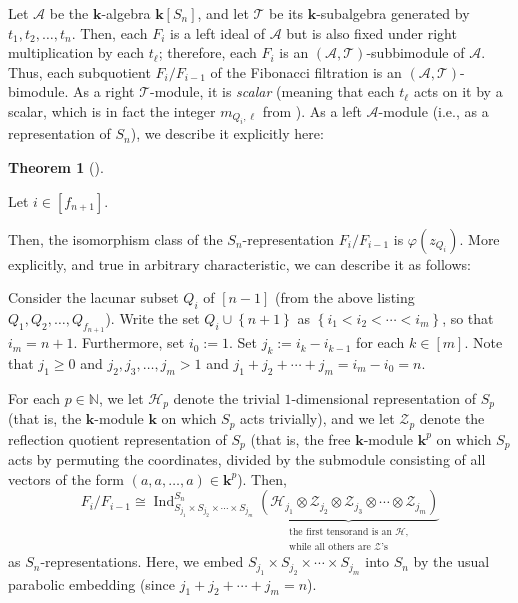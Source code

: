 \documentclass[numbers=enddot,12pt,final,onecolumn,notitlepage]{scrartcl}%
\theoremstyle{definition}
\newtheorem{theo}{Theorem}[section]
\newenvironment{theorem}[1][]
{\begin{theo}[#1]\begin{leftbar}}
{\end{leftbar}\end{theo}}
\newenvironment{noncompile}{}{}
\begin{document}
Let $\mathcal{A}$ be the $\mathbf{k}$-algebra $\mathbf{k}\left[  S_{n}\right]
$, and let $\mathcal{T}$ be its $\mathbf{k}$-subalgebra generated by
$t_{1},t_{2},\ldots,t_{n}$. Then, each $F_{i}$ is a left ideal of
$\mathcal{A}$ but is also fixed under right multiplication by each $t_{\ell}$;
therefore, each $F_{i}$ is an $\left(  \mathcal{A},\mathcal{T}\right)
$-subbimodule of $\mathcal{A}$. Thus, each subquotient $F_{i}/F_{i-1}$ of the
Fibonacci filtration is an $\left(  \mathcal{A},\mathcal{T}\right)
$-bimodule. As a right $\mathcal{T}$-module, it is \emph{scalar} (meaning that
each $t_{\ell}$ acts on it by a scalar, which is in fact the integer
$m_{Q_{i},\ell}$ from \cite[Theorem 8.1 \textbf{(c)}]{s2b1}). As a left
$\mathcal{A}$-module (i.e., as a representation of $S_{n}$), we describe it
explicitly here:

\begin{theorem}
[part of Theorem \ref{thm.Fi/Fi-1.as-ind}]\label{thm.intro.Fi/Fi-1}Let
$i\in\left[  f_{n+1}\right]  $.

\begin{noncompile}
Then, the isomorphism class of the $S_{n}$-representation $F_{i}/F_{i-1}$ is
$\varphi\left(  z_{Q_{i}}\right)  $. More explicitly, and true in arbitrary
characteristic, we can describe it as follows:
\end{noncompile}

Consider the lacunar subset $Q_{i}$ of $\left[  n-1\right]  $ (from the above
listing $Q_{1},Q_{2},\ldots,Q_{f_{n+1}}$). Write the set $Q_{i}\cup\left\{
n+1\right\}  $ as $\left\{  i_{1}<i_{2}<\cdots<i_{m}\right\}  $, so that
$i_{m}=n+1$. Furthermore, set $i_{0}:=1$. Set $j_{k}:=i_{k}-i_{k-1}$ for each
$k\in\left[  m\right]  $. Note that $j_{1}\geq0$ and $j_{2},j_{3},\ldots
,j_{m}>1$ and $j_{1}+j_{2}+\cdots+j_{m}=i_{m}-i_{0}=n$.

For each $p\in\mathbb{N}$, we let $\mathcal{H}_{p}$ denote the trivial
$1$-dimensional representation of $S_{p}$ (that is, the $\mathbf{k}$-module
$\mathbf{k}$ on which $S_{p}$ acts trivially), and we let $\mathcal{Z}_{p}$
denote the reflection quotient representation of $S_{p}$ (that is, the free
$\mathbf{k}$-module $\mathbf{k}^{p}$ on which $S_{p}$ acts by permuting the
coordinates, divided by the submodule consisting of all vectors of the form
$\left(  a,a,\ldots,a\right)  \in\mathbf{k}^{p}$). Then,%
\[
F_{i}/F_{i-1}\cong\operatorname*{Ind}\nolimits_{S_{j_{1}}\times S_{j_{2}%
}\times\cdots\times S_{j_{m}}}^{S_{n}}\underbrace{\left(  \mathcal{H}_{j_{1}%
}\otimes\mathcal{Z}_{j_{2}}\otimes\mathcal{Z}_{j_{3}}\otimes\cdots
\otimes\mathcal{Z}_{j_{m}}\right)  }_{\substack{\text{the first tensorand is
an }\mathcal{H}\text{,}\\\text{while all others are }\mathcal{Z}\text{'s}}}
\]
as $S_{n}$-representations. Here, we embed $S_{j_{1}}\times S_{j_{2}}%
\times\cdots\times S_{j_{m}}$ into $S_{n}$ by the usual parabolic embedding
(since $j_{1}+j_{2}+\cdots+j_{m}=n$).
\end{theorem}
\end{document}

